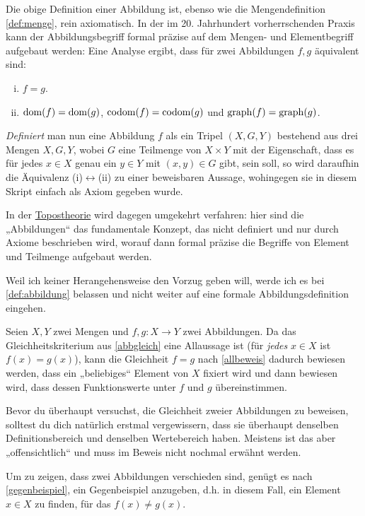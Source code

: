 \begin{vorschau}
    Die obige Definition einer Abbildung ist, ebenso wie die Mengendefinition \cref{def:menge}, rein axiomatisch. In der im 20. Jahrhundert vorherrschenden Praxis kann der Abbildungsbegriff formal präzise auf dem Mengen- und Elementbegriff aufgebaut werden: Eine Analyse ergibt, dass für zwei Abbildungen $f,g$ äquivalent sind:
    \begin{enumerate}[(i)]
        \item $f=g$.
        \item $\operatorname{dom}(f)=\operatorname{dom}(g)$, $\operatorname{codom}(f)=\operatorname{codom}(g)$ und $\operatorname{graph}(f)=\operatorname{graph}(g)$.
    \end{enumerate}
    \emph{Definiert} man nun eine Abbildung $f$ als ein Tripel $(X,G,Y)$ bestehend aus drei Mengen $X,G,Y$, wobei $G$ eine Teilmenge von $X\times Y$ mit der Eigenschaft, dass es für jedes $x\in X$ genau ein $y\in Y$ mit $(x,y)\in G$ gibt, sein soll, so wird daraufhin die Äquivalenz (i)$\leftrightarrow$(ii) zu einer beweisbaren Aussage, wohingegen sie in diesem Skript einfach als Axiom gegeben wurde.
    
    In der \href{https://en.wikipedia.org/wiki/Topos#Elementary_topoi_(topoi_in_logic)}{Topostheorie} wird dagegen umgekehrt verfahren: hier sind die „Abbildungen“ das fundamentale Konzept, das nicht definiert und nur durch Axiome beschrieben wird, worauf dann formal präzise die Begriffe von Element und Teilmenge aufgebaut werden.
    
    Weil ich keiner Herangehensweise den Vorzug geben will, werde ich es bei \cref{def:abbildung} belassen und nicht weiter auf eine formale Abbildungsdefinition eingehen.
\end{vorschau}


\begin{bem}
    Seien $X,Y$ zwei Mengen und $f,g:X\to Y$ zwei Abbildungen. Da das Gleichheitskriterium aus \cref{abbgleich} eine Allaussage ist (für \emph{jedes} $x\in X$ ist $f(x)=g(x)$), kann die Gleichheit $f=g$ nach \cref{allbeweis} dadurch bewiesen werden, dass ein „beliebiges“ Element von $X$ fixiert wird und dann bewiesen wird, dass dessen Funktionswerte unter $f$ und $g$ übereinstimmen.

    Bevor du überhaupt versuchst, die Gleichheit zweier Abbildungen zu beweisen, solltest du dich natürlich erstmal vergewissern, dass sie überhaupt denselben Definitionsbereich und denselben Wertebereich haben. Meistens ist das aber „offensichtlich“ und muss im Beweis nicht nochmal erwähnt werden.

    Um zu zeigen, dass zwei Abbildungen verschieden sind, genügt es nach \cref{gegenbeispiel}, ein Gegenbeispiel anzugeben, d.h. in diesem Fall, ein Element $x\in X$ zu finden, für das $f(x)\neq g(x)$.
\end{bem}


